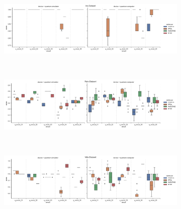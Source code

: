 \begin{figure}[!ht]
    \centering
    \\[-3ex]
    \begin{subfigure}{1.0\textwidth}
        \centering
        \includegraphics[width=1.0\linewidth]{thesis/Figures/qnn/boxplots/100_iris.png} 
        \label{subfigure:accuracy_comparison_boxplots_iris_dataset1}
    \end{subfigure}
    \\[-3ex]
    \begin{subfigure}{1.0\textwidth}
        \centering
        \includegraphics[width=1.0\linewidth]{thesis/Figures/qnn/boxplots/100_rain.png} 
        \label{subfigure:accuracy_comparison_boxplots_rain_dataset1}
    \end{subfigure}
    \\[-3ex]
    \begin{subfigure}{1.0\textwidth}
        \centering
        \includegraphics[width=1.0\linewidth]{thesis/Figures/qnn/boxplots/100_vlds.png} 
        \label{subfigure:accuracy_comparison_boxplots_vlds_dataset1}
    \end{subfigure}
    \\[-3ex]
    \begin{subfigure}{1.0\textwidth}

\end{subfigure}
\end{figure}
